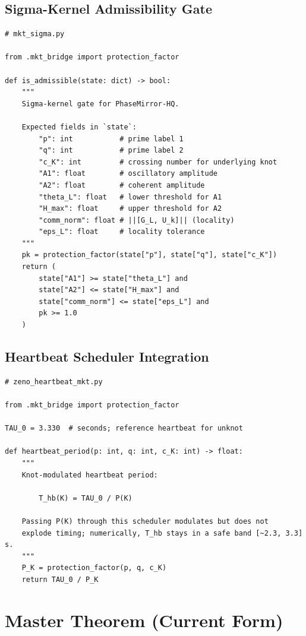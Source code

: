 \documentclass[11pt]{article}
\theoremstyle{remark}
\begin{document}
\subsection{Sigma-Kernel Admissibility Gate}

\begin{lstlisting}
# mkt_sigma.py

from .mkt_bridge import protection_factor

def is_admissible(state: dict) -> bool:
    """
    Sigma-kernel gate for PhaseMirror-HQ.

    Expected fields in `state`:
        "p": int           # prime label 1
        "q": int           # prime label 2
        "c_K": int         # crossing number for underlying knot
        "A1": float        # oscillatory amplitude
        "A2": float        # coherent amplitude
        "theta_L": float   # lower threshold for A1
        "H_max": float     # upper threshold for A2
        "comm_norm": float # ||[G_L, U_k]|| (locality)
        "eps_L": float     # locality tolerance
    """
    pk = protection_factor(state["p"], state["q"], state["c_K"])
    return (
        state["A1"] >= state["theta_L"] and
        state["A2"] <= state["H_max"] and
        state["comm_norm"] <= state["eps_L"] and
        pk >= 1.0
    )
\end{lstlisting}

\subsection{Heartbeat Scheduler Integration}

\begin{lstlisting}
# zeno_heartbeat_mkt.py

from .mkt_bridge import protection_factor

TAU_0 = 3.330  # seconds; reference heartbeat for unknot

def heartbeat_period(p: int, q: int, c_K: int) -> float:
    """
    Knot-modulated heartbeat period:

        T_hb(K) = TAU_0 / P(K)

    Passing P(K) through this scheduler modulates but does not
    explode timing; numerically, T_hb stays in a safe band [~2.3, 3.3] s.
    """
    P_K = protection_factor(p, q, c_K)
    return TAU_0 / P_K
\end{lstlisting}

\section{Master Theorem (Current Form)}
\end{document}
